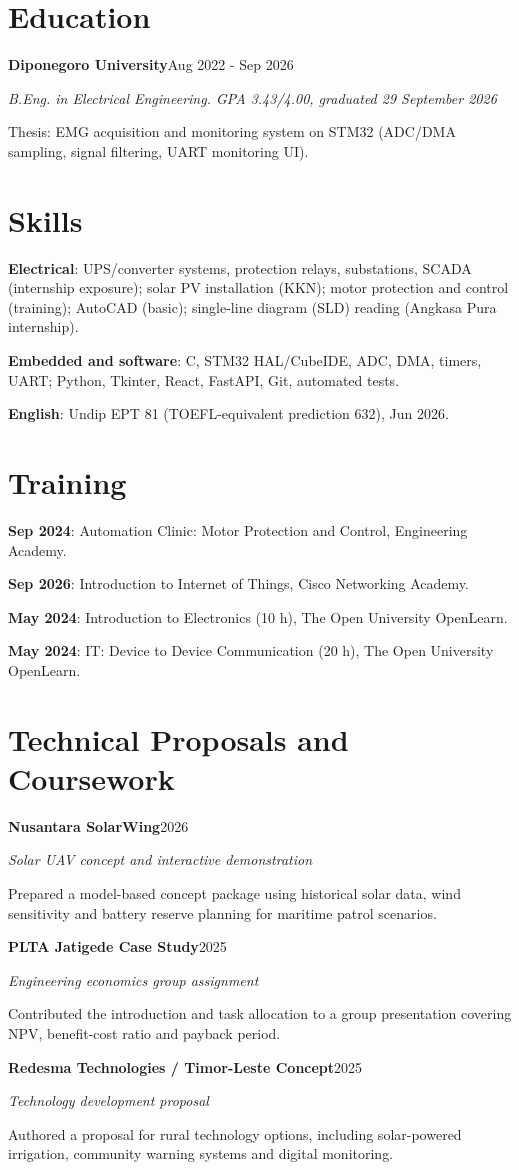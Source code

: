 \documentclass[11pt,a4paper]{article}
\newcommand{\cventry}[5]{\Needspace{4\baselineskip}\textbf{#3}\ifstrempty{#4}{}{, #4}\hfill #1\par\textit{#2}\par #5\par\vspace{4pt}}
\newcommand{\cvitem}[2]{\textbf{#1}: #2\par}
\begin{document}
\section{Education}
\cventry{Aug 2022 - Sep 2026}{B.Eng. in Electrical Engineering. GPA 3.43/4.00, graduated 29 September 2026}{Diponegoro University}{}{Thesis: EMG acquisition and monitoring system on STM32 (ADC/DMA sampling, signal filtering, UART monitoring UI).}
\section{Skills}
\cvitem{Electrical}{UPS/converter systems, protection relays, substations, SCADA (internship exposure); solar PV installation (KKN); motor protection and control (training); AutoCAD (basic); single-line diagram (SLD) reading (Angkasa Pura internship).}
\cvitem{Embedded and software}{C, STM32 HAL/CubeIDE, ADC, DMA, timers, UART; Python, Tkinter, React, FastAPI, Git, automated tests.}
\cvitem{English}{Undip EPT 81 (TOEFL-equivalent prediction 632), Jun 2026.}
\section{Training}
\cvitem{Sep 2024}{Automation Clinic: Motor Protection and Control, Engineering Academy.}
\cvitem{Sep 2026}{Introduction to Internet of Things, Cisco Networking Academy.}
\cvitem{May 2024}{Introduction to Electronics (10 h), The Open University OpenLearn.}
\cvitem{May 2024}{IT: Device to Device Communication (20 h), The Open University OpenLearn.}
\section{Technical Proposals and Coursework}
\cventry{2026}{Solar UAV concept and interactive demonstration}{Nusantara SolarWing}{}{Prepared a model-based concept package using historical solar data, wind sensitivity and battery reserve planning for maritime patrol scenarios.}
\cventry{2025}{Engineering economics group assignment}{PLTA Jatigede Case Study}{}{Contributed the introduction and task allocation to a group presentation covering NPV, benefit-cost ratio and payback period.}
\cventry{2025}{Technology development proposal}{Redesma Technologies / Timor-Leste Concept}{}{Authored a proposal for rural technology options, including solar-powered irrigation, community warning systems and digital monitoring.}
\end{document}
